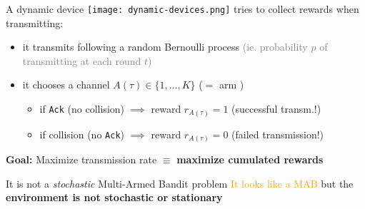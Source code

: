 \begin{frameO}

    A dynamic device \texttt{[image: dynamic-devices.png]}  tries to collect \alert{rewards} when transmitting:

    \begin{itemize}
        \item
            it transmits following a random Bernoulli process \newline
            \textcolor{gray}{(ie. probability \(p\) of transmitting at each round \(t\))}
        \item
            it chooses a channel \(A(\tau) \in \{1,\dots,K\}\)
            \hfill{} ($=$ arm \slotmachine)
        \begin{itemize}
        \item
            if \texttt{Ack} (no collision) \hspace*{2pt} \(\implies\) \alert{reward
            \(r_{A(\tau)} = 1\)} \hfill{} (successful transm.!)
        \item
            if collision (no \texttt{Ack}) \hspace*{2pt} \(\implies\) \alert{reward
            \(r_{A(\tau)} = 0\)} \hfill{} (failed transmission!)
        \end{itemize}

    \end{itemize}

    \pause

    \vspace*{15pt}

    \begin{colorblock}{}
        \vspace*{4pt}
        \textbf{Goal:}
        Maximize transmission rate \(\equiv\) \textbf{maximize \alert{cumulated rewards}}
        \vspace*{4pt}
    \end{colorblock}

    \vspace*{5pt}

    \begin{lightblock}{It is not a \emph{stochastic} Multi-Armed Bandit problem}
        \textcolor{orange}{It looks like a MAB}
        but the \textbf{environment is not stochastic or stationary}
    \end{lightblock}

\end{frameO}

